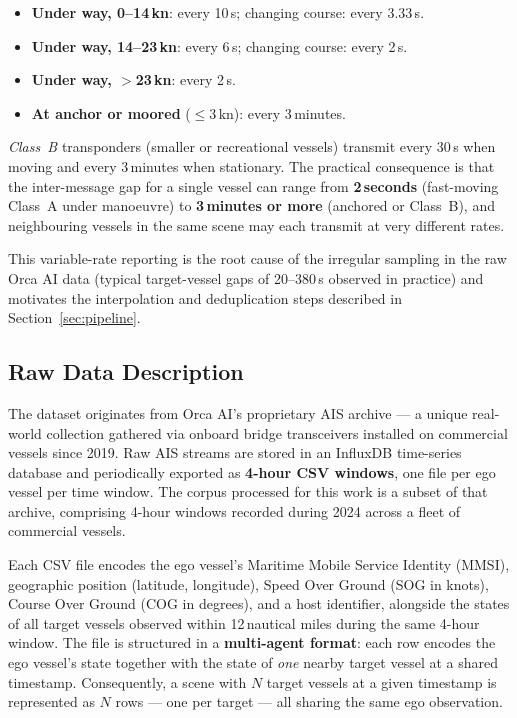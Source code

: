 \documentclass[12pt, a4paper]{article}
\begin{document}
  \begin{itemize}
      \item \textbf{Under way, 0--14\,kn}: every 10\,s; changing course: every 3.33\,s.
      \item \textbf{Under way, 14--23\,kn}: every 6\,s; changing course: every 2\,s.
      \item \textbf{Under way, $>$23\,kn}: every 2\,s.
      \item \textbf{At anchor or moored} ($\leq$3\,kn): every 3\,minutes.
  \end{itemize}

  \textit{Class~B} transponders (smaller or recreational vessels) transmit every 30\,s
  when moving and every 3\,minutes when stationary.  The practical consequence is that
  the inter-message gap for a single vessel can range from \textbf{2\,seconds}
  (fast-moving Class~A under manoeuvre) to \textbf{3\,minutes or more}
  (anchored or Class~B), and neighbouring vessels in the same scene may each transmit at
  very different rates.

  This variable-rate reporting is the root cause of the irregular sampling in the raw
  Orca AI data (typical target-vessel gaps of 20--380\,s observed in practice) and
  motivates the interpolation and deduplication steps described in
  Section~\ref{sec:pipeline}.

  \subsection{Raw Data Description}

  The dataset originates from Orca AI's proprietary AIS archive — a unique real-world collection
  gathered via onboard bridge transceivers installed on commercial vessels since 2019.
  Raw AIS streams are stored in an InfluxDB time-series database and periodically exported as
  \textbf{4-hour CSV windows}, one file per ego vessel per time window.  The corpus processed
  for this work is a subset of that archive, comprising 4-hour windows recorded during 2024
  across a fleet of commercial vessels.

  Each CSV file encodes the ego vessel's Maritime Mobile Service Identity (MMSI), geographic
  position (latitude, longitude), Speed Over Ground (SOG in knots), Course Over Ground
  (COG in degrees), and a host identifier, alongside the states of all target vessels observed
  within 12\,nautical miles during the same 4-hour window.
  The file is structured in a \textbf{multi-agent format}: each row encodes the ego vessel's
  state together with the state of \emph{one} nearby target vessel at a shared timestamp.
  Consequently, a scene with $N$ target vessels at a given timestamp is represented as $N$ rows
  — one per target — all sharing the same ego observation.
\end{document}
